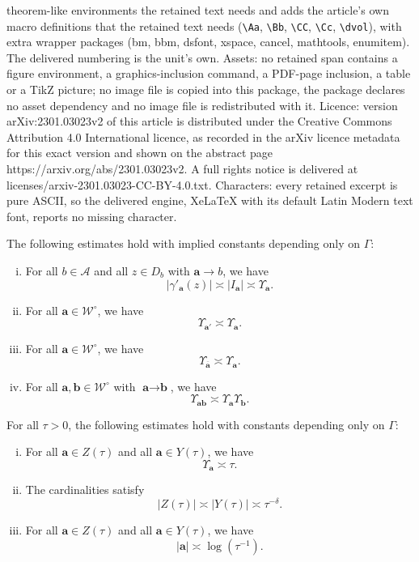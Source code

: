 \documentclass[10pt,a4paper]{amsart}
\newcommand{\Aa}{\textbf{a}}
\newcommand{\Bb}{\textbf{b}}
\begin{document}
theorem-like environments the retained text needs and adds the article's own macro definitions that the retained text needs (\texttt{\textbackslash Aa}, \texttt{\textbackslash Bb}, \texttt{\textbackslash CC}, \texttt{\textbackslash Cc}, \texttt{\textbackslash dvol}), with extra wrapper packages (bm, bbm, dsfont, xspace, cancel, mathtools, enumitem). The delivered numbering is the unit's own. Assets: no retained span contains a figure environment, a graphics-inclusion command, a PDF-page inclusion, a table or a TikZ picture; no image file is copied into this package, the package declares no asset dependency and no image file is redistributed with it. Licence: version arXiv:2301.03023v2 of this article is distributed under the Creative Commons Attribution 4.0 International licence, as recorded in the arXiv licence metadata for this exact version and shown on the abstract page https://arxiv.org/abs/2301.03023v2. A full rights notice is delivered at licenses/arxiv-2301.03023-CC-BY-4.0.txt. Characters: every retained excerpt is pure ASCII, so the delivered engine, XeLaTeX with its default Latin Modern text font, reports no missing character.
\begin{lemma}\label{lem:boundsderivatives}
The following estimates hold with implied constants depending only on $\Gamma$:
\begin{enumerate}[(i)]
\item \label{part:ups} For all $b \in \mathcal{A}$ and all $z \in D_b$ with $\Aa \to b$, we have
\[
|\gamma'_{\Aa}(z)| \asymp \vert I_\Aa\vert \asymp \Upsilon_{\Aa}.
\]

\item For all $\Aa \in \mathcal{W}^\circ$, we have
\[
\Upsilon_{\Aa'} \asymp \Upsilon_{\Aa}.
\]

\item \label{part:mirrorEst} For all $\Aa \in \mathcal{W}^\circ$, we have
\[
\Upsilon_{\overline{\Aa}} \asymp \Upsilon_{\Aa}.
\]

\item \label{part:almostMultip} For all $\Aa, \Bb \in \mathcal{W}^\circ$ with $\Aa \to \Bb$, we have
\[
\Upsilon_{\Aa\Bb} \asymp \Upsilon_{\Aa} \Upsilon_{\Bb}.
\]
\end{enumerate}
\end{lemma}

\begin{lemma}\label{lem:YZ}
For all $\tau > 0$, the following estimates hold with constants depending only on $\Gamma$:
\begin{enumerate}[(i)]
\item For all $\Aa \in Z(\tau)$ and all $\Aa \in Y(\tau)$, we have
\[
\Upsilon_{\Aa} \asymp \tau.
\]

\item \label{cardinalityzy} The cardinalities satisfy
\[
|Z(\tau)| \asymp |Y(\tau)| \asymp \tau^{-\delta}.
\]

\item \label{lengthsofwords} For all $\Aa \in Z(\tau)$ and all $\Aa \in Y(\tau)$, we have
\[
|\Aa| \asymp \log(\tau^{-1}).
\]
\end{enumerate}
\end{lemma}
\end{document}
